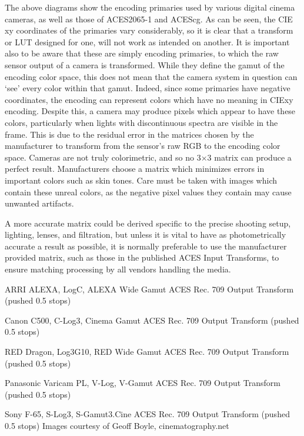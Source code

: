 The above diagrams show the encoding primaries used by various digital cinema cameras, as well as those of ACES2065-1 and ACEScg. As can be seen, the CIE xy coordinates of the primaries vary considerably, so it is clear that a transform or LUT designed for one, will not work as intended on another. It is important also to be aware that these are simply encoding primaries, to which the raw sensor output of a camera is transformed. While they define the gamut of the encoding color space, this does not mean that the camera system in question can ‘see’ every color within that gamut. Indeed, since some primaries have negative coordinates, the encoding can represent colors which have no meaning in CIExy encoding. Despite this, a camera may produce pixels which appear to have these colors, particularly when lights with discontinuous spectra are visible in the frame. This is due to the residual error in the matrices chosen by the manufacturer to transform from the sensor’s raw RGB to the encoding color space. Cameras are not truly colorimetric, and so no 3×3 matrix can produce a perfect result. Manufacturers choose a matrix which minimizes errors in important colors such as skin tones. Care must be taken with images which contain these unreal colors, as the negative pixel values they contain may cause unwanted artifacts.

A more accurate matrix could be derived specific to the precise shooting setup, lighting, lenses, and filtration, but unless it is vital to have as photometrically accurate a result as possible, it is normally preferable to use the manufacturer provided matrix, such as those in the published ACES Input Transforms, to ensure matching processing by all vendors handling the media.


ARRI ALEXA, LogC, ALEXA Wide Gamut	ACES Rec. 709 Output Transform (pushed 0.5 stops)

Canon C500, C-Log3, Cinema Gamut	ACES Rec. 709 Output Transform (pushed 0.5 stops)

RED Dragon, Log3G10, RED Wide Gamut	ACES Rec. 709 Output Transform (pushed 0.5 stops)

Panasonic Varicam PL, V-Log, V-Gamut	ACES Rec. 709 Output Transform (pushed 0.5 stops)

Sony F-65, S-Log3, S-Gamut3.Cine	ACES Rec. 709 Output Transform (pushed 0.5 stops)
Images courtesy of Geoff Boyle, cinematography.net

